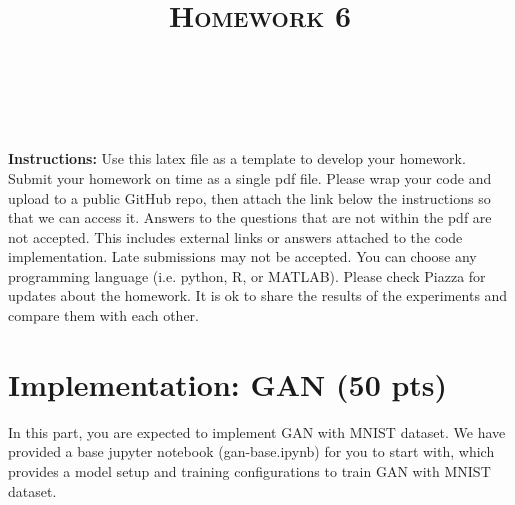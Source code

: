 \documentclass[a4paper]{article}
\title{\textsc{Homework 6}} %
\author{
	\red{Nevindu M. Batagoda} \\
	\red{9081677594}\\
}
\date{}
\theoremstyle{definition}
\begin{document}
	
	\maketitle 
	
        \textbf{Instructions:}
        Use this latex file as a template to develop your homework. Submit your homework on time as a single pdf file. Please wrap your code and upload to a public GitHub repo, then attach the link below the instructions so that we can access it. Answers to the questions that are not within the pdf are not accepted. This includes external links or answers attached to the code implementation. Late submissions may not be accepted. You can choose any programming language (i.e. python, R, or MATLAB). Please check Piazza for updates about the homework. It is ok to share the results of the experiments and compare them with each other.
        \vspace{0.1in}
	
	\section{Implementation: GAN (50 pts)}
	In this part, you are expected to implement GAN with MNIST dataset. We have provided a base jupyter notebook (gan-base.ipynb) for you to start with, which provides a model setup and training configurations to train GAN with MNIST dataset.
	
\end{document}
